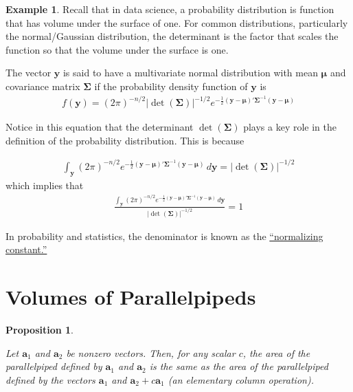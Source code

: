 \documentclass[
]{book}
\newtheorem{proposition}{Proposition}[chapter]
\theoremstyle{definition}
\theoremstyle{definition}
\newtheorem{example}{Example}[chapter]
\theoremstyle{definition}
\theoremstyle{remark}
\begin{document}
\begin{example}
\protect\hypertarget{exm:unnamed-chunk-222}{}{\label{exm:unnamed-chunk-222} }Recall that in data science, a probability distribution is function that has volume under the surface of one. For common distributions, particularly the normal/Gaussian distribution, the determinant is the factor that scales the function so that the volume under the surface is one.

The vector \(\mathbf{y}\) is said to have a multivariate normal distribution with mean \(\boldsymbol{\mu}\) and covariance matrix \(\boldsymbol{\Sigma}\) if the probability density function of \(\mathbf{y}\) is
\[
\begin{aligned}
f(\mathbf{y}) = (2 \pi)^{-n/2} |\det(\boldsymbol{\Sigma})|^{-1/2} e^{- \frac{1}{2} (\mathbf{y} - \boldsymbol{\mu})' \boldsymbol{\Sigma}^{-1} (\mathbf{y} - \boldsymbol{\mu})}
\end{aligned}
\]

Notice in this equation that the determinant \(\det(\boldsymbol{\Sigma})\) plays a key role in the definition of the probability distribution. This is because

\[\begin{aligned}
\int_{\mathbf{y}} (2 \pi)^{-n/2} e^{- \frac{1}{2} (\mathbf{y} - \boldsymbol{\mu})' \boldsymbol{\Sigma}^{-1} (\mathbf{y} - \boldsymbol{\mu})} \, d\mathbf{y} = |\det(\boldsymbol{\Sigma})|^{-1/2}
\end{aligned}
\]
which implies that
\[
\begin{aligned}
\frac{\int_{\mathbf{y}} (2 \pi)^{-n/2} e^{- \frac{1}{2} (\mathbf{y} - \boldsymbol{\mu})' \boldsymbol{\Sigma}^{-1} (\mathbf{y} - \boldsymbol{\mu})} \, d\mathbf{y}}{|\det(\boldsymbol{\Sigma})|^{-1/2}} = 1
\end{aligned}
\]

In probability and statistics, the denominator is known as the \href{https://en.wikipedia.org/wiki/Normalizing_constant}{``normalizing constant.''}
\end{example}

\hypertarget{volumes-of-parallelpipeds}{%
\section{Volumes of Parallelpipeds}\label{volumes-of-parallelpipeds}}

\begin{proposition}
\protect\hypertarget{prp:unlabeled-div-114}{}\label{prp:unlabeled-div-114}

Let \(\mathbf{a}_1\) and \(\mathbf{a}_2\) be nonzero vectors. Then, for any scalar \(c\), the area of the parallelpiped defined by \(\mathbf{a}_1\) and \(\mathbf{a}_2\) is the same as the area of the parallelpiped defined by the vectors \(\mathbf{a}_1\) and \(\mathbf{a}_2 + c \mathbf{a}_1\) (an elementary column operation).

\end{proposition}
\end{document}

